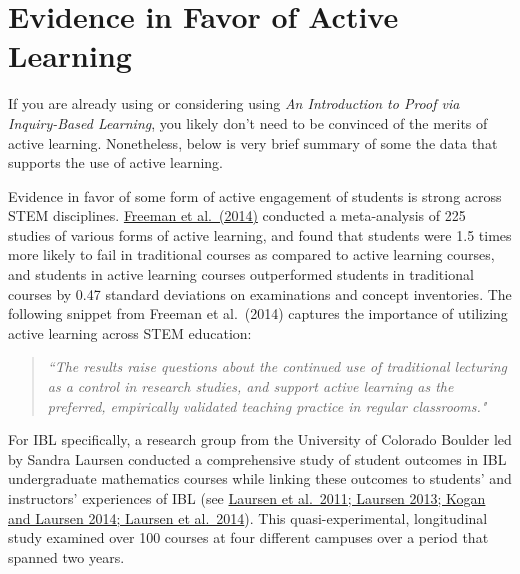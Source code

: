 \documentclass[11pt]{article}%
\newcommand{\blankline}{\pagebreak[2]\vspace{.5\baselineskip}}
\begin{document}
\section*{Evidence in Favor of Active Learning}

If you are already using or considering using \emph{An Introduction to Proof via Inquiry-Based Learning}, you likely don't need to be convinced of the merits of active learning.  Nonetheless, below is very brief summary of some the data that supports the use of active learning.

\blankline

Evidence in favor of some form of active engagement of students is strong across STEM disciplines. \href{https://pubmed.ncbi.nlm.nih.gov/24821756/}{Freeman et al.~(2014)} conducted a meta-analysis of 225 studies of various forms of active learning, and found that students were 1.5 times more likely to fail in traditional courses as compared to active learning courses, and students in active learning courses outperformed students in traditional courses by 0.47 standard deviations on examinations and concept inventories. The following snippet from Freeman et al.~(2014) captures the importance of utilizing active learning across STEM education:
\begin{quote}
\emph{``The results raise questions about the continued use of traditional lecturing as a control in research studies, and support active learning as the preferred, empirically validated teaching practice in regular classrooms."}
\end{quote}

For IBL specifically, a research group from the University of Colorado Boulder led by Sandra Laursen conducted a comprehensive study of student outcomes in IBL undergraduate mathematics courses while linking these outcomes to students' and instructors' experiences of IBL (see \href{https://www.colorado.edu/eer/research-areas/student-centered-stem-education/inquiry-based-learning-college-mathematics}{Laursen et al.~2011; Laursen 2013; Kogan and Laursen 2014; Laursen et al.~2014}). This quasi-experimental, longitudinal study examined over 100 courses at four different campuses over a period that spanned two years.

\blankline
\end{document}
